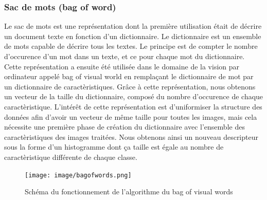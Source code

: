 \subsubsection{Sac de mots (bag of word)}
Le sac de mots est une représentation dont la première utilisation était de décrire un document texte en fonction d'un dictionnaire.
Le dictionnaire est un ensemble de mots capable de décrire tous les textes.
Le principe est de compter le nombre d'occurence d'un mot dans un texte, et ce pour chaque mot du dictionnaire. Cette représentation
a ensuite été utilisée dans le domaine de la vision par ordinateur appelé \og bag of visual world \fg\cite{BagOfWord} 
en remplaçant le dictionnaire de mot par un dictionnaire
de caractèristiques. Grâce à cette représentation, nous obtenons un vecteur de la taille du dictionnaire, composé du nombre 
d'occurence de chaque caractèristique. L'intérêt de cette représentation est d'uniformiser la structure des données
afin d'avoir un vecteur de même taille pour toutes les images, mais cela nécessite une première phase de création du dictionnaire
avec l'ensemble des caractèristiques des images traitées. Nous obtenons ainsi un nouveau descripteur sous la forme d'un
histogramme dont ça taille est égale au nombre de caractèristique différente de chaque classe.

\begin{figure}[!ht]
  \begin{center}
    \texttt{[image: image/bagofwords.png]}
    \caption[The LOF caption]{Schéma du fonctionnement de l'algorithme du bag of visual words\footnotemark }
  \end{center}
\end{figure}

